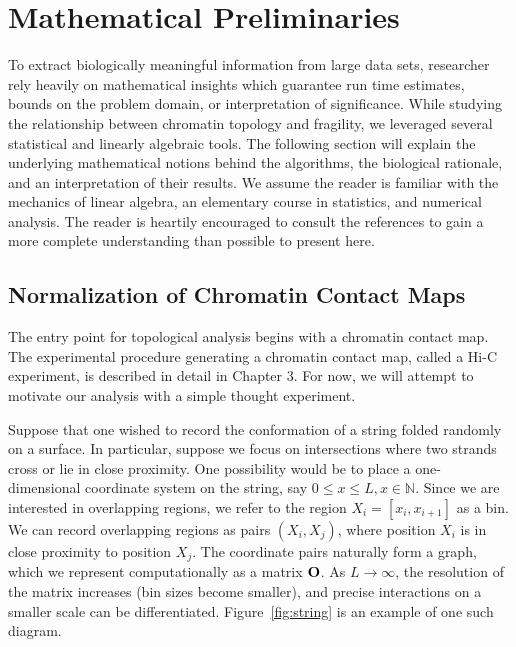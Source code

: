 
\chapter{Mathematical Preliminaries}

To extract biologically meaningful information from large data sets, researcher rely heavily on mathematical insights which
guarantee run time estimates, bounds on the problem domain, or interpretation of significance.  While studying the relationship
between chromatin topology and fragility, we leveraged several statistical and linearly algebraic tools.  The following section
will explain the underlying mathematical notions behind the algorithms, the biological rationale, and an interpretation of their
results.  We assume the reader is familiar with the mechanics of linear algebra, an elementary course in statistics, and numerical
analysis.  The reader is heartily encouraged to consult the references to gain a more complete understanding than possible to
present here.

\section*{Normalization of Chromatin Contact Maps}

The entry point for topological analysis begins with a chromatin \gls{contact map}.  The experimental procedure generating a chromatin
contact map, called a Hi-C experiment, is described in detail in Chapter 3.  For now, we will attempt to motivate our
analysis with a simple thought experiment.

Suppose that one wished to record the conformation of a string folded randomly on a surface.  In particular, suppose we focus on intersections
where two strands cross or lie in close proximity.  One possibility would be to place a one-dimensional coordinate system on the string, say
$0 \leq  x \leq  L, x \in \mathbb{N}$.  Since we are interested in overlapping regions, we refer to the region $X_i = \left[ x_{i}, x_{i+1}\right]$
as a bin.  We can record overlapping regions as pairs $(X_i,X_j)$, where position $X_i$ is in close proximity to position $X_j$.  The
coordinate pairs naturally form a graph, which we represent computationally as a matrix $\mathbf{O}$.  As $L \rightarrow \infty$, the
resolution of the matrix increases (bin sizes become smaller), and precise interactions on a smaller scale can be differentiated.
Figure~\ref{fig:string} is an example of one such diagram.

